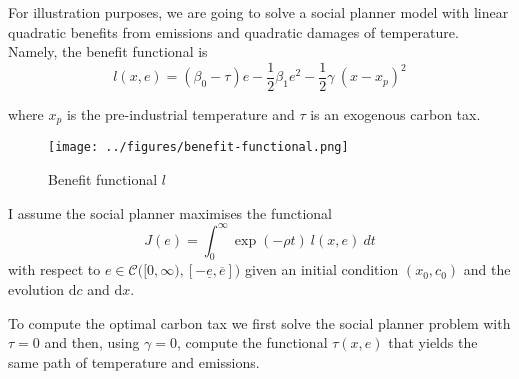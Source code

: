 \documentclass[../../main.tex]{subfiles}
\begin{document}
For illustration purposes, we are going to solve a social planner model with linear quadratic benefits from emissions and quadratic damages of temperature. Namely, the benefit functional is \begin{equation}
    l(x, e) = (\beta_0 - \tau) e - \frac{1}{2}\beta_1 e^2 - \frac{1}{2} \gamma \ (x - x_p)^2
\end{equation} 

where $x_p$ is the pre-industrial temperature and $\tau$ is an exogenous carbon tax. 


\begin{figure}[H]
    \centering
    \texttt{[image: ../figures/benefit-functional.png]}
    \caption{Benefit functional $l$}
    \label{fig:benefit-functional}
\end{figure}

I assume the social planner maximises the functional \begin{equation}
    J(e) = \int_0^\infty  \exp(-\rho t) \ l(x, e) \ dt
\end{equation} with respect to $e \in \mathcal{C}\Big([0, \infty), [-\underline{e}, \overline{e}]\Big)$ given an initial condition $(x_0, c_0)$ and the evolution $\text{d}c$ and $\text{d}x$.

To compute the optimal carbon tax we first solve the social planner problem with $\tau = 0$ and then, using $\gamma = 0$, compute the functional $\tau(x, e)$ that yields the same path of temperature and emissions.  
\end{document}
